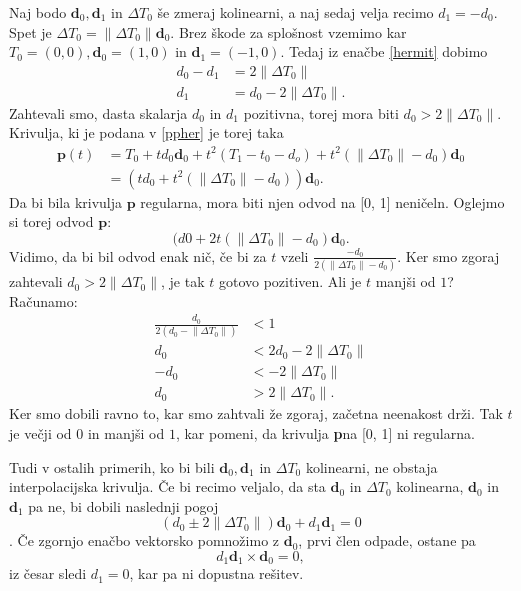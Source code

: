 \documentclass[mat1]{fmfdelo}
\newcommand{\de}{\Delta}
\newcommand{\dd}{\textbf{d}}
\newcommand{\pp}{\textbf{p}}
\begin{document}
Naj bodo $\dd_0, \dd_1$ in $\de T_0$ še zmeraj kolinearni, a naj sedaj velja recimo $d_1 = - d_0$. Spet je $ \de T_0 = \lVert \de T_0 \rVert \dd_0$. Brez škode za splošnost vzemimo kar $T_0 = (0,0), \dd_0 = (1,0)$ in $\dd_1 = (-1, 0)$. Tedaj iz enačbe \eqref{hermit} dobimo
%
\begin{align*}
d_0 - d_1 &= 2\lVert \de T_0 \rVert \\
d_1 &= d_0 - 2\lVert \de T_0 \rVert.
\end{align*}
%
Zahtevali smo, dasta skalarja $d_0$ in $d_1$ pozitivna, torej mora biti $d_0 > 2 \lVert \de T_0 \rVert$. Krivulja, ki je podana v \eqref{ppher} je torej taka
\begin{align*}
\pp(t) &=  T_0 + t d_0 \dd_0 + t^2(T_1 - t_0 - d_o) + t^2(\lVert \de T_0 \rVert - d_0) \dd_0 \\
& = (t d_0 + t^2(\lVert \de T_0 \rVert - d_0)) \dd_0.
\end{align*}
Da bi bila krivulja $\pp$ regularna, mora biti njen odvod na [0, 1] neničeln. Oglejmo si torej odvod $\pp$:
\begin{equation*}
(d0 + 2t (\lVert \de T_0 \rVert - d_0) \dd_0.
\end{equation*}
%
Vidimo, da bi bil odvod enak nič, če bi za $t$ vzeli $\frac{- d_0}{2(\lVert \de T_0 \rVert - d_0)}$. Ker smo zgoraj zahtevali $d_0 > 2 \lVert \de T_0 \rVert$, je tak $t$ gotovo pozitiven. Ali je $t$ manjši od $1$? Računamo:
\begin{align*}
\frac{d_0}{2(d_0 - \lVert \de T_0 \rVert )} &< 1 \\
d_0 &< 2 d_0 - 2 \lVert \de T_0 \rVert \\
-d_0 &< - 2 \lVert \de T_0 \rVert \\
d_0 &> 2 \lVert \de T_0 \rVert.
\end{align*}
%
Ker smo dobili ravno to, kar smo zahtvali že zgoraj, začetna neenakost drži. Tak $t$ je večji od $0$ in manjši od $1$, kar pomeni, da krivulja \pp na [0, 1] ni regularna.

Tudi v ostalih primerih, ko bi bili $\dd_0, \dd_1$ in $\de T_0$ kolinearni, ne obstaja interpolacijska krivulja. Če bi recimo veljalo, da sta $\dd_0$ in $\de T_0$ kolinearna, $\dd_0$ in $\dd_1$ pa ne, bi dobili naslednji pogoj
\begin{equation*}
(d_0 \pm 2 \lVert \de T_0 \rVert) \dd_0 + d_1 \dd_1 = 0
\end{equation*}.
%
Če zgornjo enačbo vektorsko pomnožimo z $\dd_0$, prvi člen odpade, ostane pa
\begin{equation*}
d_1 \dd_1 \times \dd_0 = 0,
\end{equation*}
%
iz česar sledi $d_1 = 0$, kar pa ni dopustna rešitev.
\end{document}
